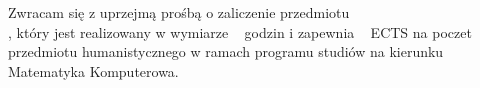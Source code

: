 \documentclass{wmiisubmission}
\begin{document}
\cracowdate
{}
\studentaddress
\addressee{\bakalarski}

\vskip 2.0cm

Zwracam się z uprzejmą prośbą o zaliczenie przedmiotu\\
\fillField{16cm}, który jest realizowany w wymiarze \fillField{3cm}~ godzin
i zapewnia \fillField{1cm}~ ECTS na poczet
przedmiotu humanistycznego w ramach programu studiów na kierunku Matematyka Komputerowa.

\vskip 2cm
\studentsignature

\vfill


\vskip 1.5cm

\end{document}
